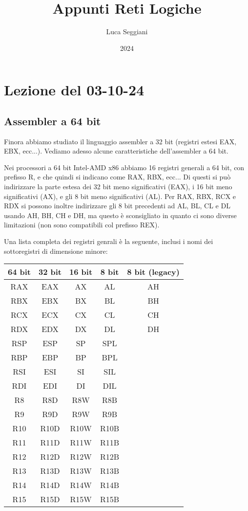 \documentclass[a4paper,11pt]{article}
\title{Appunti Reti Logiche}
\author{Luca Seggiani}
\date{2024}
\begin{document}
\section{Lezione del 03-10-24}

\thispagestyle{empty}
\pagestyle{fancy}

\subsection{Assembler a 64 bit}
Finora abbiamo studiato il linguaggio assembler a 32 bit (registri estesi EAX, EBX, ecc...).
Vediamo adesso alcune caratteristiche dell'assembler a 64 bit.

Nei processori a 64 bit Intel-AMD x86 abbiamo 16 registri generali a 64 bit, con prefisso R, e che quindi si indicano come RAX, RBX, ecc...
Di questi si può indirizzare la parte estesa dei 32 bit meno significativi (EAX), i 16 bit meno significativi (AX), e gli 8 bit meno significativi (AL).
Per RAX, RBX, RCX e RDX si possono inoltre indirizzare gli 8 bit precedenti ad AL, BL, CL e DL usando AH, BH, CH e DH, ma questo è sconsigliato in quanto ci sono diverse limitazioni (non sono compatibili col prefisso REX).

Una lista completa dei registri genrali è la seguente, inclusi i nomi dei sottoregistri di dimensione minore:

\begin{table}[h!]
	\center {}
	\begin{tabular} { c || c | c | c | c }
		\bfseries 64 bit & \bfseries 32 bit & \bfseries 16 bit & \bfseries 8 bit & \bfseries 8 bit (legacy) \\
		\hline 
		RAX & EAX & AX & AL & AH \\
		RBX & EBX & BX & BL & BH \\
		RCX & ECX & CX & CL & CH \\
		RDX & EDX & DX & DL & DH \\
		RSP & ESP & SP & SPL & \\
		RBP & EBP & BP & BPL & \\
		RSI & ESI & SI & SIL & \\
		RDI & EDI & DI & DIL & \\
		R8 &R8D &R8W &R8B & \\
		R9 &R9D &R9W &R9B & \\
		R10&R10D&R10W&R10B & \\
		R11&R11D&R11W&R11B & \\
		R12&R12D&R12W&R12B & \\
		R13&R13D&R13W&R13B & \\
		R14&R14D&R14W&R14B & \\
		R15&R15D&R15W&R15B & \\
	\end{tabular}
\end{table}
\end{document}
